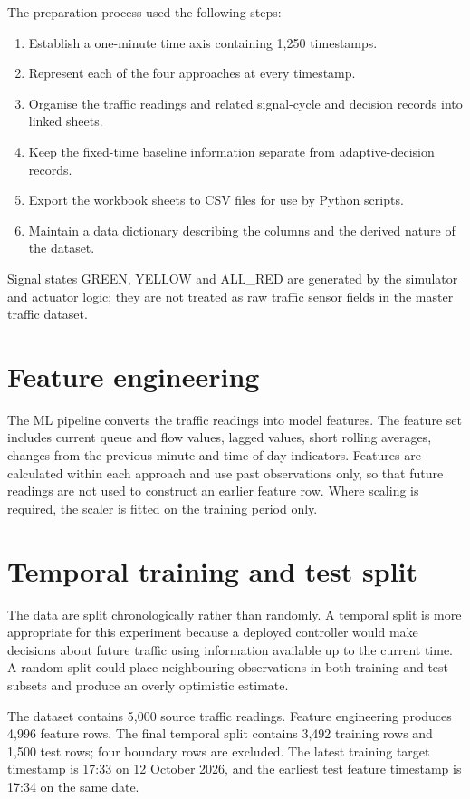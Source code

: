 \documentclass[12pt,a4paper,oneside]{report}
\begin{document}
The preparation process used the following steps:
\begin{enumerate}
  \item Establish a one-minute time axis containing 1,250 timestamps.
  \item Represent each of the four approaches at every timestamp.
  \item Organise the traffic readings and related signal-cycle and decision records into linked sheets.
  \item Keep the fixed-time baseline information separate from adaptive-decision records.
  \item Export the workbook sheets to CSV files for use by Python scripts.
  \item Maintain a data dictionary describing the columns and the derived nature of the dataset.
\end{enumerate}

Signal states GREEN, YELLOW and ALL\_RED are generated by the simulator and actuator logic; they are not treated as raw traffic sensor fields in the master traffic dataset.

\section{Feature engineering}
The ML pipeline converts the traffic readings into model features. The feature set includes current queue and flow values, lagged values, short rolling averages, changes from the previous minute and time-of-day indicators. Features are calculated within each approach and use past observations only, so that future readings are not used to construct an earlier feature row. Where scaling is required, the scaler is fitted on the training period only.

\section{Temporal training and test split}
The data are split chronologically rather than randomly. A temporal split is more appropriate for this experiment because a deployed controller would make decisions about future traffic using information available up to the current time. A random split could place neighbouring observations in both training and test subsets and produce an overly optimistic estimate.

The dataset contains 5,000 source traffic readings. Feature engineering produces 4,996 feature rows. The final temporal split contains 3,492 training rows and 1,500 test rows; four boundary rows are excluded. The latest training target timestamp is 17:33 on 12 October 2026, and the earliest test feature timestamp is 17:34 on the same date.
\end{document}
